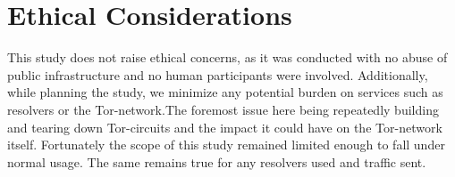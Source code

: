 \section{Ethical Considerations}

This study does not raise ethical concerns, as it was conducted with no abuse of public infrastructure and no human participants were involved. 
Additionally, while planning the study, we minimize any potential burden  on services such as resolvers or the Tor-network.The foremost issue here being repeatedly building and tearing down Tor-circuits and the impact it could have on the Tor-network itself. Fortunately the scope of this study remained limited enough to fall under normal usage. The same remains true for any resolvers used and traffic sent.
